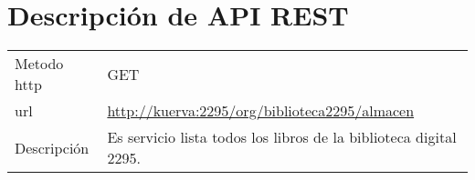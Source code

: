 \chapter{Descripción de API REST}

\begin{table}[H]
\centering
\begin{tabular}{|lp{10cm}|} \hline
Metodo http & GET \\%
url   &  \url{http://kuerva:2295/org/biblioteca2295/almacen}\\
Descripción & Es servicio lista todos los libros de la biblioteca digital 2295.\\ \hline
\end{tabular}
\end{table}